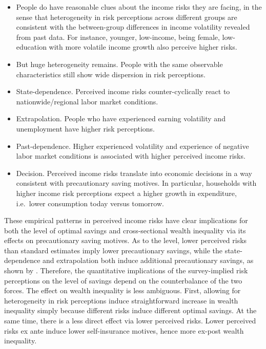 \begin{itemize}

\item People do have reasonable clues about the income risks they are facing, in the sense that heterogeneity in risk perceptions across different groups are consistent with the between-group differences in income volatility revealed from past data. For instance, younger, low-income, being female, low-education with more volatile income growth also perceive higher risks.

\item But huge heterogeneity remains. People with the same observable characteristics still show wide dispersion in risk perceptions. 

\item State-dependence.  Perceived income risks counter-cyclically react to nationwide/regional labor market conditions. 

\item Extrapolation. People who have experienced earning volatility and unemployment have higher risk perceptions. 

\item Past-dependence. Higher experienced volatility and experience of negative labor market conditions is associated with higher perceived income risks. 
 
 
\item Decision. Perceived income risks translate into economic decisions in a way consistent with precautionary saving motives. In particular, households with higher income risk perceptions expect a higher growth in expenditure, i.e.~lower consumption today versus tomorrow.
\end{itemize}


These empirical patterns in perceived income risks have clear implications for both the level of optimal savings and cross-sectional wealth inequality via its effects on precautionary saving motives. As to the level, lower perceived risks than standard estimates imply lower precautionary savings, while the state-dependence and extrapolation both induce additional precautionary savings, as shown by \cite{caballero1990consumption}. Therefore, the quantitative implications of the survey-implied risk perceptions on the level of savings depend on the counterbalance of the two forces. The effect on wealth inequality is less ambiguous. First, allowing for heterogeneity in risk perceptions induce straightforward increase in wealth inequality simply because different risks induce different optimal savings. At the same time, there is a less direct effect via lower perceived risks. Lower perceived risks ex ante induce lower self-insurance motives, hence more ex-post wealth inequality. 

